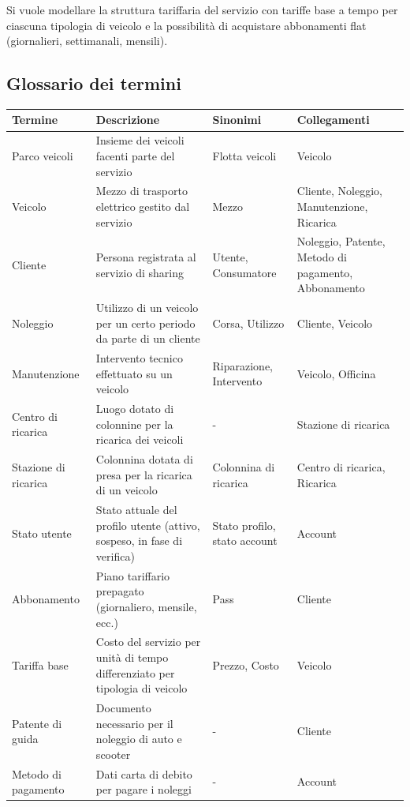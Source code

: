 \documentclass{article}
\begin{document}
Si vuole modellare la struttura tariffaria del servizio con tariffe base a tempo per ciascuna tipologia di veicolo e la possibilità di acquistare abbonamenti flat (giornalieri, settimanali, mensili).

\subsection{Glossario dei termini}

\begin{table}[H]
\centering
\begin{tabularx}{\textwidth}{|p{2.2cm}|X|p{2.6cm}|p{3cm}|}
\hline
\textbf{Termine} & \textbf{Descrizione} & \textbf{Sinonimi} & \textbf{Collegamenti} \\ \hline
Parco veicoli & Insieme dei veicoli facenti parte del servizio & Flotta veicoli & Veicolo \\ \hline
Veicolo & Mezzo di trasporto elettrico gestito dal servizio & Mezzo & Cliente, Noleggio, Manutenzione, Ricarica \\ \hline
Cliente & Persona registrata al servizio di sharing & Utente, Consumatore & Noleggio, Patente, Metodo di pagamento, Abbonamento \\ \hline
Noleggio & Utilizzo di un veicolo per un certo periodo da parte di un cliente & Corsa, Utilizzo & Cliente, Veicolo \\ \hline
Manutenzione & Intervento tecnico effettuato su un veicolo & Riparazione, Intervento & Veicolo, Officina \\ \hline
Centro di ricarica & Luogo dotato di colonnine per la ricarica dei veicoli & - & Stazione di ricarica \\ \hline
Stazione di ricarica & Colonnina dotata di presa per la ricarica di un veicolo & Colonnina di ricarica & Centro di ricarica, Ricarica \\ \hline
Stato utente & Stato attuale del profilo utente (attivo, sospeso, in fase di verifica) & Stato profilo, stato account & Account \\ \hline
Abbonamento & Piano tariffario prepagato (giornaliero, mensile, ecc.) & Pass & Cliente \\ \hline
Tariffa base & Costo del servizio per unità di tempo differenziato per tipologia di veicolo & Prezzo, Costo & Veicolo \\ \hline
Patente di guida & Documento necessario per il noleggio di auto e scooter & - & Cliente \\ \hline
Metodo di pagamento & Dati carta di debito per pagare i noleggi & - & Account \\ \hline

\end{tabularx}
\end{table}
\end{document}
